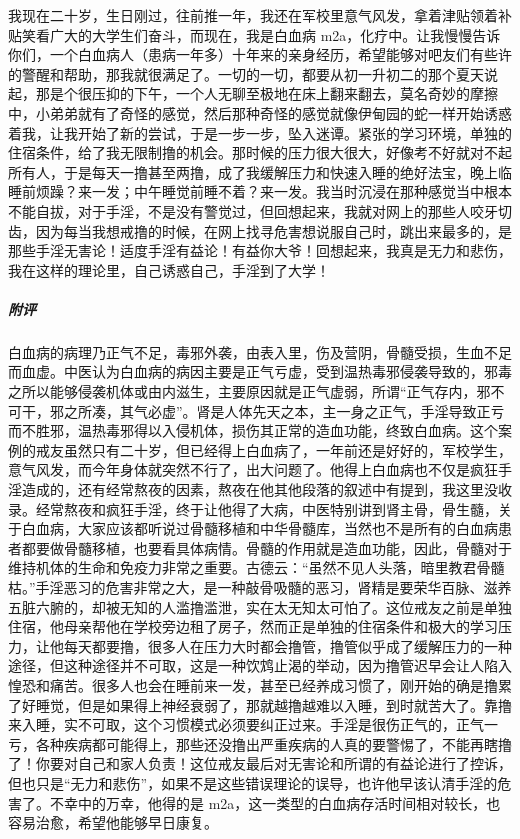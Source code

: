 \begin{case}
    我现在二十岁，生日刚过，往前推一年，我还在军校里意气风发，拿着津贴领着补贴笑看广大的大学生们奋斗，而现在，我是白血病 m2a，化疗中。让我慢慢告诉你们，一个白血病人（患病一年多）十年来的亲身经历，希望能够对吧友们有些许的警醒和帮助，那我就很满足了。一切的一切，都要从初一升初二的那个夏天说起，那是个很压抑的下午，一个人无聊至极地在床上翻来翻去，莫名奇妙的摩擦中，小弟弟就有了奇怪的感觉，然后那种奇怪的感觉就像伊甸园的蛇一样开始诱惑着我，让我开始了新的尝试，于是一步一步，坠入迷谭。紧张的学习环境，单独的住宿条件，给了我无限制撸的机会。那时候的压力很大很大，好像考不好就对不起所有人，于是每天一撸甚至两撸，成了我缓解压力和快速入睡的绝好法宝，晚上临睡前烦躁？来一发；中午睡觉前睡不着？来一发。我当时沉浸在那种感觉当中根本不能自拔，对于手淫，不是没有警觉过，但回想起来，我就对网上的那些人咬牙切齿，因为每当我想戒撸的时候，在网上找寻危害想说服自己时，跳出来最多的，是那些手淫无害论！适度手淫有益论！有益你大爷！回想起来，我真是无力和悲伤，我在这样的理论里，自己诱惑自己，手淫到了大学！
    \subparagraph{附评} 白血病的病理乃正气不足，毒邪外袭，由表入里，伤及营阴，骨髓受损，生血不足而血虚。中医认为白血病的病因主要是正气亏虚，受到温热毒邪侵袭导致的，邪毒之所以能够侵袭机体或由内滋生，主要原因就是正气虚弱，所谓“正气存内，邪不可干，邪之所凑，其气必虚”。肾是人体先天之本，主一身之正气，手淫导致正亏而不胜邪，温热毒邪得以入侵机体，损伤其正常的造血功能，终致白血病。这个案例的戒友虽然只有二十岁，但已经得上白血病了，一年前还是好好的，军校学生，意气风发，而今年身体就突然不行了，出大问题了。他得上白血病也不仅是疯狂手淫造成的，还有经常熬夜的因素，熬夜在他其他段落的叙述中有提到，我这里没收录。经常熬夜和疯狂手淫，终于让他得了大病，中医特别讲到肾主骨，骨生髓，关于白血病，大家应该都听说过骨髓移植和中华骨髓库，当然也不是所有的白血病患者都要做骨髓移植，也要看具体病情。骨髓的作用就是造血功能，因此，骨髓对于维持机体的生命和免疫力非常之重要。古德云：“虽然不见人头落，暗里教君骨髓枯。”手淫恶习的危害非常之大，是一种敲骨吸髓的恶习，肾精是要荣华百脉、滋养五脏六腑的，却被无知的人滥撸滥泄，实在太无知太可怕了。这位戒友之前是单独住宿，他母亲帮他在学校旁边租了房子，然而正是单独的住宿条件和极大的学习压力，让他每天都要撸，很多人在压力大时都会撸管，撸管似乎成了缓解压力的一种途径，但这种途径并不可取，这是一种饮鸩止渴的举动，因为撸管迟早会让人陷入惶恐和痛苦。很多人也会在睡前来一发，甚至已经养成习惯了，刚开始的确是撸累了好睡觉，但是如果得上神经衰弱了，那就越撸越难以入睡，到时就苦大了。靠撸来入睡，实不可取，这个习惯模式必须要纠正过来。手淫是很伤正气的，正气一亏，各种疾病都可能得上，那些还没撸出严重疾病的人真的要警惕了，不能再瞎撸了！你要对自己和家人负责！这位戒友最后对无害论和所谓的有益论进行了控诉，但也只是“无力和悲伤”，如果不是这些错误理论的误导，也许他早该认清手淫的危害了。不幸中的万幸，他得的是 m2a，这一类型的白血病存活时间相对较长，也容易治愈，希望他能够早日康复。
\end{case}


